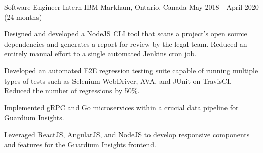\begin{cventries}
\cventry
{Software Engineer Intern} %
{IBM} %
{Markham, Ontario, Canada} %
{May 2018 - April 2020 (24 months)} %
{ %
\begin{cvitems}
\item {Designed and developed a NodeJS CLI tool that scans a project's open source dependencies and generates a report for review by the legal team. Reduced an entirely manual effort to a single automated Jenkins cron job.}
\item {Developed an automated E2E regression testing suite capable of running multiple types of tests such as Selenium WebDriver, AVA, and JUnit on TravisCI. Reduced the number of regressions by 50\%.}
\item {Implemented gRPC and Go microservices within a crucial data pipeline for Guardium Insights.}
\item {Leveraged ReactJS, AngularJS, and NodeJS to develop responsive components and features for the Guardium Insights frontend.}
\end{cvitems}
}


\end{cventries}
